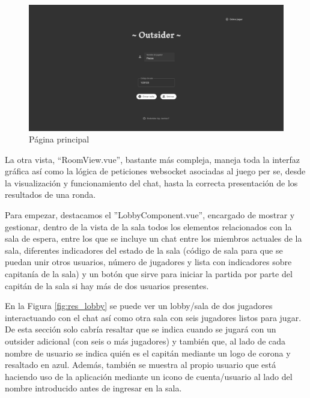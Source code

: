 \begin{figure}[h]
	\centering
	\includegraphics[width=\textwidth,clip=true]{res_mainpage.png}
	\caption{Página principal}
	\label{fig:res_mainpage}
\end{figure}

La otra vista, ``RoomView.vue'', bastante más compleja, maneja toda la interfaz gráfica así como la lógica de peticiones websocket asociadas al juego per se, desde la
visualización y funcionamiento del chat, hasta la correcta presentación de los resultados de una ronda.

Para empezar, destacamos el ''LobbyComponent.vue'', encargado de mostrar y gestionar, dentro de la vista de la sala todos los elementos relacionados con la sala de espera, entre los que se
incluye un chat entre los miembros actuales de la sala, diferentes indicadores del estado de la sala (código de sala para que se puedan unir otros usuarios, número de jugadores y
lista con indicadores sobre capitanía de la sala) y un botón que sirve para iniciar la partida por parte del capitán de la sala si hay más de dos usuarios presentes.

En la Figura \ref{fig:res_lobby} se puede ver un lobby/sala de dos jugadores interactuando con el chat así como otra sala con seis jugadores listos para jugar. De esta sección solo
cabría resaltar que se indica cuando se jugará con un outsider adicional (con seis o más jugadores) y también que, al lado de cada nombre de usuario se indica quién es el capitán mediante
un logo de corona y resaltado en azul. Además, también se muestra al propio usuario que está haciendo uso de la aplicación mediante un icono de cuenta/usuario al lado del nombre introducido
antes de ingresar en la sala.

